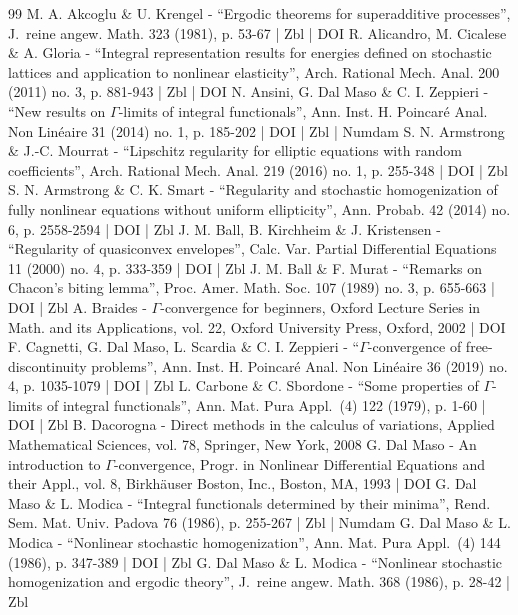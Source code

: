 \begin{thebibliography}{99}
M. A. Akcoglu \& U. Krengel - “Ergodic theorems for superadditive processes”, J. reine angew. Math. 323 (1981), p. 53-67 | Zbl | DOI
R. Alicandro, M. Cicalese \& A. Gloria - “Integral representation results for energies defined on stochastic lattices and application to nonlinear elasticity”, Arch. Rational Mech. Anal. 200 (2011) no. 3, p. 881-943 | Zbl | DOI
N. Ansini, G. Dal Maso \& C. I. Zeppieri - “New results on $\Gamma $-limits of integral functionals”, Ann. Inst. H. Poincaré Anal. Non Linéaire 31 (2014) no. 1, p. 185-202 | DOI | Zbl | Numdam
S. N. Armstrong \& J.-C. Mourrat - “Lipschitz regularity for elliptic equations with random coefficients”, Arch. Rational Mech. Anal. 219 (2016) no. 1, p. 255-348 | DOI | Zbl
S. N. Armstrong \& C. K. Smart - “Regularity and stochastic homogenization of fully nonlinear equations without uniform ellipticity”, Ann. Probab. 42 (2014) no. 6, p. 2558-2594 | DOI | Zbl
J. M. Ball, B. Kirchheim \& J. Kristensen - “Regularity of quasiconvex envelopes”, Calc. Var. Partial Differential Equations 11 (2000) no. 4, p. 333-359 | DOI | Zbl
J. M. Ball \& F. Murat - “Remarks on Chacon’s biting lemma”, Proc. Amer. Math. Soc. 107 (1989) no. 3, p. 655-663 | DOI | Zbl
A. Braides - $\Gamma $-convergence for beginners, Oxford Lecture Series in Math. and its Applications, vol. 22, Oxford University Press, Oxford, 2002 | DOI
F. Cagnetti, G. Dal Maso, L. Scardia \& C. I. Zeppieri - “$\Gamma $-convergence of free-discontinuity problems”, Ann. Inst. H. Poincaré Anal. Non Linéaire 36 (2019) no. 4, p. 1035-1079 | DOI | Zbl
L. Carbone \& C. Sbordone - “Some properties of $\Gamma $-limits of integral functionals”, Ann. Mat. Pura Appl. (4) 122 (1979), p. 1-60 | DOI | Zbl
B. Dacorogna - Direct methods in the calculus of variations, Applied Mathematical Sciences, vol. 78, Springer, New York, 2008
G. Dal Maso - An introduction to $\Gamma $-convergence, Progr. in Nonlinear Differential Equations and their Appl., vol. 8, Birkhäuser Boston, Inc., Boston, MA, 1993 | DOI
G. Dal Maso \& L. Modica - “Integral functionals determined by their minima”, Rend. Sem. Mat. Univ. Padova 76 (1986), p. 255-267 | Zbl | Numdam
G. Dal Maso \& L. Modica - “Nonlinear stochastic homogenization”, Ann. Mat. Pura Appl. (4) 144 (1986), p. 347-389 | DOI | Zbl
G. Dal Maso \& L. Modica - “Nonlinear stochastic homogenization and ergodic theory”, J. reine angew. Math. 368 (1986), p. 28-42 | Zbl

\end{thebibliography}
